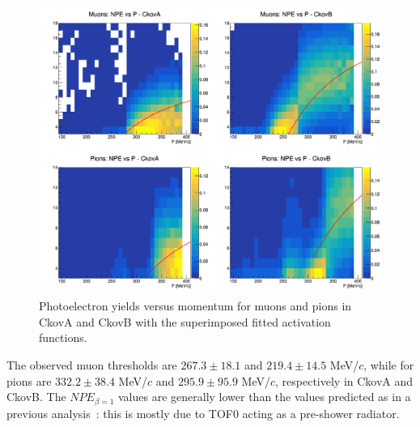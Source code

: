 
\begin{figure}[htb!]
  \begin{center}
    \includegraphics[width=0.85\columnwidth]{./03-Ckov/Figures/scatter_activation.png}
    \caption{Photoelectron yields versus momentum for muons and pions in CkovA and CkovB with the superimposed fitted activation functions.}
    \label{fig:ckov2}
  \end{center}
\end{figure}

The observed muon thresholds are $267.3\pm18.1$ and $219.4\pm14.5$ MeV/$c$, while for pions are $332.2\pm38.4$ MeV/$c$ and $295.9\pm95.9$ MeV/$c$, respectively in CkovA and CkovB. The $NPE_{\beta=1}$ values are generally lower than the values predicted as in a previous analysis~\cite{NOTE473}: this is mostly due to TOF0 acting as a pre-shower radiator.


